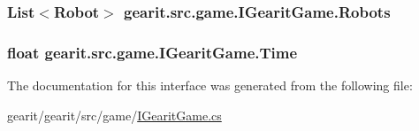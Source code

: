 \hypertarget{interfacegearit_1_1src_1_1game_1_1_i_gearit_game_a52f47e836daf8245f23d699446f75e54}{
\subsubsection[{Robots}]{\setlength{\rightskip}{0pt plus 5cm}List$<${\bf Robot}$>$ gearit.\+src.\+game.\+I\+Gearit\+Game.\+Robots\hspace{0.3cm}{\ttfamily [get]}}}\label{interfacegearit_1_1src_1_1game_1_1_i_gearit_game_a52f47e836daf8245f23d699446f75e54}
\hypertarget{interfacegearit_1_1src_1_1game_1_1_i_gearit_game_a9d09c8a74366320d3bd457bd9d2852bc}{
\subsubsection[{Time}]{\setlength{\rightskip}{0pt plus 5cm}float gearit.\+src.\+game.\+I\+Gearit\+Game.\+Time\hspace{0.3cm}{\ttfamily [get]}}}\label{interfacegearit_1_1src_1_1game_1_1_i_gearit_game_a9d09c8a74366320d3bd457bd9d2852bc}


The documentation for this interface was generated from the following file\+:\begin{DoxyCompactItemize}
\item 
gearit/gearit/src/game/\hyperlink{_i_gearit_game_8cs}{I\+Gearit\+Game.\+cs}\end{DoxyCompactItemize}
